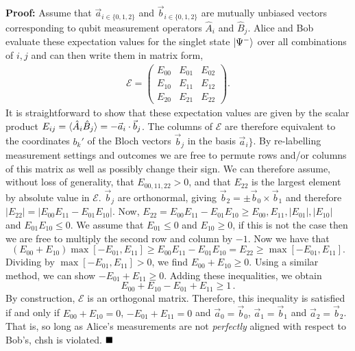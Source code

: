 \vspace{5mm}
\noindent\textbf{Proof:}
Assume that $\vec{a}_{i\in \{0,1,2\}}$ and $\vec{b}_{i\in \{0,1,2\}}$ are mutually unbiased vectors corresponding to qubit measurement operators $\hat{A}_i$ and $\hat{B}_j$. 
Alice and Bob evaluate these expectation values for the singlet state $\mbox{$ | \Psi^- \rangle $}$ over all combinations of $i, j$ and can then write them in matrix form,
\begin{eqnarray}
\label{matrix}
\mathcal{E} = \left(
\begin{array}{ccc}
E_{00} & E_{01} & E_{02} \\
E_{10} & E_{11} & E_{12} \\
E_{20} & E_{21} & E_{22}
\end{array}
\right).
\label{eqn:chsh-three-matrix}
\end{eqnarray}
It is straightforward to show that these expectation values are given by the scalar product $E_{ij} = \langle \hat{A}_i \hat{B}_j \rangle = -\vec{a}_i \cdot \vec{b}_j$.  
The columns of $\mathcal{E}$ are therefore equivalent to the coordinates $b_k'$ of the Bloch vectors $\vec{b}_j$ in the basis $\vec{a}_i\}$.  
By re-labelling measurement settings and outcomes we are free to permute rows and/or columns of this matrix as well as possibly change their sign. 
We can therefore assume, without loss of generality, that $E_{00, 11, 22} > 0$, and that $E_{22}$ is the largest element by absolute value in $\mathcal{E}$. 
$\vec{b}_j$ are orthonormal, giving 
$\vec{b}_2 = \pm \vec{b}_0 \times \vec{b}_1$ and therefore 
$|E_{22}| = |E_{00}E_{11} - E_{01}E_{10}|$.
Now, 
$E_{22} = E_{00} E_{11} - E_{01} E_{10}
\geq E_{00} , E_{11} , |E_{01}|, |E_{10}|$ 
and
$E_{01} E_{10} \leq 0$. 
We assume that $E_{01} \leq 0$ and $E_{10} \geq 0$, if this is not the case then we are free to multiply the second row and column by $-1$.  Now we have that
\begin{equation}
(E_{00} + E_{10}) \max[-E_{01},E_{11}] \geq E_{00} E_{11} - E_{01} E_{10} = E_{22} \geq \max[-E_{01},E_{11}].
\end{equation}
Dividing by $\max[-E_{01},E_{11}] > 0$, we find 
$E_{00} + E_{10} \geq 0$. Using a similar method, we can show 
$ -E_{01} + E_{11} \geq 0$.
Adding these inequalities, we obtain
\begin{equation}
E_{00} + E_{10} - E_{01} + E_{11} \geq 1 \,. \label{ineq_proof}
\end{equation}
By construction, $\mathcal{E}$ is an orthogonal matrix. Therefore, this inequality is satisfied if and only if 
$E_{00} + E_{10} = 0$, 
$-E_{01} + E_{11} = 0$ 
and 
$\vec{a}_0 = \vec{b}_0$, $\vec{a}_1 = \vec{b}_1$ and $\vec{a}_2 = \vec{b}_2$. That is, so long as Alice's measurements are not \emph{perfectly} aligned with respect to Bob's, \gls{chsh} is violated.
$\hfill\blacksquare$

